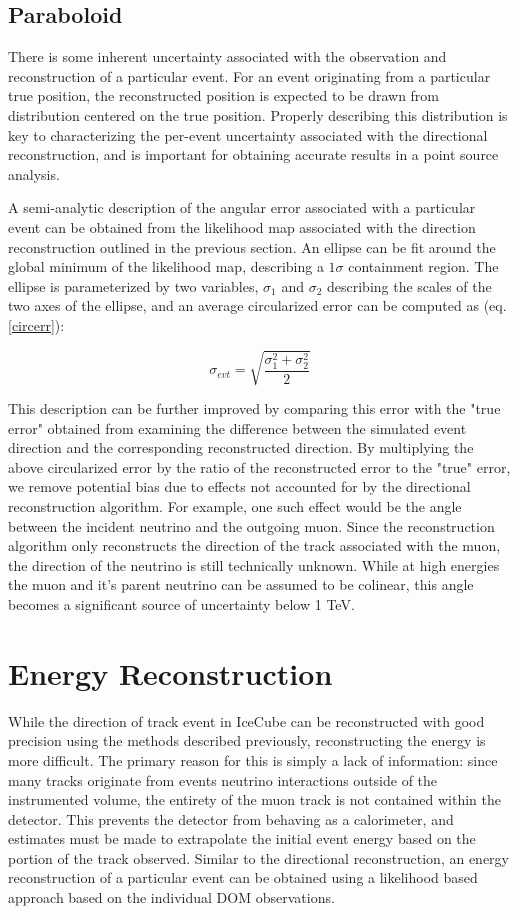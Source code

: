 \subsection{Paraboloid}
There is some inherent uncertainty associated with the observation and reconstruction of a particular event. For an event originating from a particular true position, the reconstructed position is expected to be drawn from distribution centered on the true position. Properly describing this distribution is key to characterizing the per-event uncertainty associated with the directional reconstruction, and is important for obtaining accurate results in a point source analysis.

A semi-analytic description of the angular error associated with a particular event can be obtained from the likelihood map associated with the direction reconstruction outlined in the previous section. An ellipse can be fit around the global minimum of the likelihood map, describing a $1 \sigma$ containment region. The ellipse is parameterized by two variables, $\sigma_1$ and $\sigma_2$ describing the scales of the two axes of the ellipse, and an average circularized error can be computed as (eq. \ref{circerr})\cite{paraboloidpaper}:

\begin{equation}
    \sigma_{evt} = \sqrt{\frac{\sigma_1^2 + \sigma_2^2}{2}}
\label{circerr}
\end{equation}

This description can be further improved by comparing this error with the "true error" obtained from examining the difference between the simulated event direction and the corresponding reconstructed direction. By multiplying the above circularized error by the ratio of the reconstructed error to the "true" error, we remove potential bias due to effects not accounted for by the directional reconstruction algorithm. For example, one such effect would be the angle between the incident neutrino and the outgoing muon. Since the reconstruction algorithm only reconstructs the direction of the track associated with the muon, the direction of the neutrino is still technically unknown. While at high energies the muon and it's parent neutrino can be assumed to be colinear, this angle becomes a significant source of uncertainty below 1 TeV. 

\section{Energy Reconstruction}
While the direction of track event in IceCube can be reconstructed with good precision using the methods described previously, reconstructing the energy is more difficult. The primary reason for this is simply a lack of information: since many tracks originate from events neutrino interactions outside of the instrumented volume, the entirety of the muon track is not contained within the detector. This prevents the detector from behaving as a calorimeter, and estimates must be made to extrapolate the initial event energy based on the portion of the track observed. Similar to the directional reconstruction, an energy reconstruction of a particular event can be obtained using a likelihood based approach based on the individual DOM observations. 

